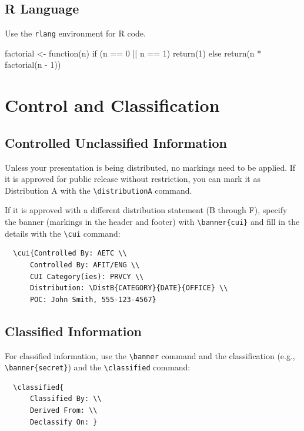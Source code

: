 \documentclass{afitdefense}
\begin{document}
\section{R Language}

Use the \verb|rlang| environment for R code.
\begin{rlang}
factorial <- function(n) {
    if (n == 0 || n == 1) {
        return(1)
    } else {
        return(n * factorial(n - 1))
    }
}
\end{rlang}

\chapter{Control and Classification}

\section{Controlled Unclassified Information}

Unless your presentation is being distributed, no markings need to be applied.
If it is approved for public release without restriction, you can mark it as
Distribution A with the \verb|\distributionA| command.

If it is approved with a different distribution statement (B through F), specify
the banner (markings in the header and footer) with \verb|\banner{cui}| and fill
in the details with the \verb|\cui| command:
\begin{verbatim}
  \cui{Controlled By: AETC \\
      Controlled By: AFIT/ENG \\
      CUI Category(ies): PRVCY \\
      Distribution: \DistB{CATEGORY}{DATE}{OFFICE} \\
      POC: John Smith, 555-123-4567}
\end{verbatim}

\section{Classified Information}

For classified information, use the \verb|\banner| command and the
classification (e.g., \verb|\banner{secret}|) and the \verb|\classified|
command:
\begin{verbatim}
  \classified{
      Classified By: \\
      Derived From: \\
      Declassify On: }
\end{verbatim}
\end{document}
